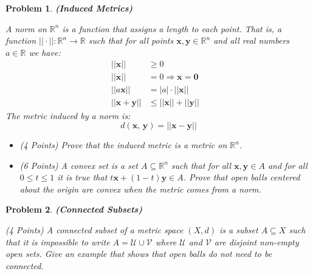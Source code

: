 \documentclass{article}
\theoremstyle{normal}
\newtheorem{problem}{Problem}
\begin{document}
    \begin{problem}
        \textbf{(Induced Metrics)}
        \par\hfill\par
        A \textit{norm} on $\mathbb{R}^{n}$ is a function that assigns a
        \textit{length} to each point. That is, a function
        $||\cdot||:\mathbb{R}^{n}\rightarrow\mathbb{R}$ such that for all
        points $\mathbf{x},\mathbf{y}\in\mathbb{R}^{n}$ and all real numbers
        $a\in\mathbb{R}$ we have:
        \begin{align}
            ||\mathbf{x}||&\geq{0}&\tag{Positivity}\\
            ||\mathbf{x}||&=0
                \Rightarrow\mathbf{x}=\mathbf{0}\tag{Definiteness}\\
            ||a\mathbf{x}||&=|a|\cdot||\mathbf{x}||
                \tag{Homogeneity}\\
            ||\mathbf{x}+\mathbf{y}||&\leq||\mathbf{x}||+||\mathbf{y}||
                \tag{Triangle-Inequality}
        \end{align}
        The metric induced by a norm is:
        \begin{equation}
            d(\mathbf{x},\,\mathbf{y})=||\mathbf{x}-\mathbf{y}||
        \end{equation}
        \begin{itemize}
            \item (4 Points) Prove that the induced metric is a metric on
                $\mathbb{R}^{n}$.
            \item (6 Points) A convex set is a set $A\subseteq\mathbb{R}^{n}$
                such that for all $\mathbf{x},\mathbf{y}\in{A}$ and for all
                $0\leq{t}\leq{1}$ it is true that
                $t\mathbf{x}+(1-t)\mathbf{y}\in{A}$. Prove that open balls
                centered about the origin are convex when the metric comes from
                a norm.
        \end{itemize}
    \end{problem}
    \begin{problem}
        \textbf{(Connected Subsets)}
        \par\hfill\par
        (4 Points)
        A connected subset of a metric space $(X,d)$ is a subset
        $A\subseteq{X}$ such that it is impossible to write
        $A=\mathcal{U}\cup\mathcal{V}$ where $\mathcal{U}$ and $\mathcal{V}$
        are disjoint non-empty open sets. Give an example that shows that
        open balls do not need to be connected.
    \end{problem}
\end{document}
